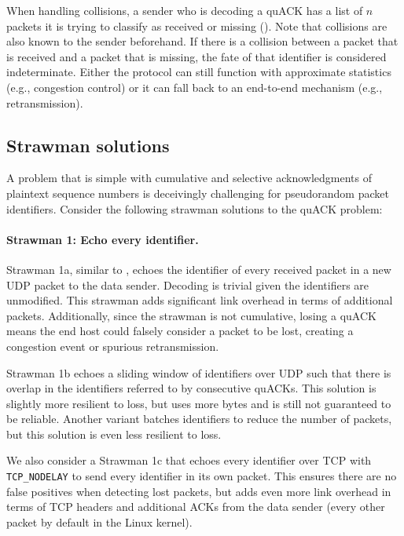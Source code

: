 When handling collisions, a sender who is decoding a quACK has a list of $n$
packets it is trying to classify as received or missing
(). Note that collisions are also known to the
sender beforehand. If there is a collision between a packet that is received
and a packet that is missing, the fate of that identifier is considered
indeterminate. Either the protocol can still function with approximate
statistics (e.g., congestion control) or it can fall back to an end-to-end
mechanism (e.g., retransmission).

\subsection{Strawman solutions}
\label{sec:quack:problem:strawmen}



A problem that is simple with cumulative and selective acknowledgments of
plaintext sequence numbers is deceivingly challenging for pseudorandom
packet identifiers. Consider the following strawman solutions to the quACK
problem:

\paragraph{Strawman 1: Echo every identifier.}
Strawman 1a, similar to \cite{li-tsvwg-loops-problem-opportunities-06,kramer2020lwpep},
echoes the identifier of every received packet in a new UDP packet to the data
sender.  Decoding is trivial given the identifiers are unmodified.
This strawman adds significant link overhead in terms of additional packets.
Additionally, since the strawman is not cumulative, losing a quACK means the
end host could falsely consider a packet to be lost, creating a congestion
event or spurious retransmission.

Strawman 1b echoes a sliding window of identifiers over UDP such that there is overlap
in the identifiers referred to by consecutive quACKs.
This solution is slightly more resilient to loss, but uses more bytes and is
still not guaranteed to be reliable.
Another variant batches identifiers to reduce the number of packets, but this
solution is even less resilient to loss.

We also consider a Strawman 1c that echoes every identifier over TCP with
\texttt{TCP\_NODELAY} to send every identifier in its own packet.
This ensures there are no false positives when detecting lost packets,
but adds even more link overhead in terms of TCP headers and additional ACKs
from the data sender (every other packet by default in the Linux kernel).

